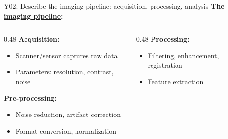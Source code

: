 \documentclass[aspectratio=169, 10pt]{beamer}
\begin{document}
\begin{frame}{Y02: Describe the imaging pipeline: acquisition, processing, analysis}
    \textbf{The \href{https://en.wikipedia.org/wiki/Image_processing}{imaging pipeline}:}
    
    \vspace{0.2cm}
    \begin{center}
    \end{center}
    
    \vspace{0.2cm}
    \begin{columns}[T]
        \begin{column}{0.48\textwidth}
            \textbf{Acquisition:}
            \begin{itemize}
                \item Scanner/sensor captures raw data
                \item Parameters: resolution, contrast, noise
            \end{itemize}
            
            \textbf{Pre-processing:}
            \begin{itemize}
                \item Noise reduction, artifact correction
                \item Format conversion, normalization
            \end{itemize}
        \end{column}
        \begin{column}{0.48\textwidth}
            \textbf{Processing:}
            \begin{itemize}
                \item Filtering, enhancement, registration
                \item Feature extraction
            \end{itemize}
            

\end{column}
\end{columns}
\end{frame}
\end{document}
